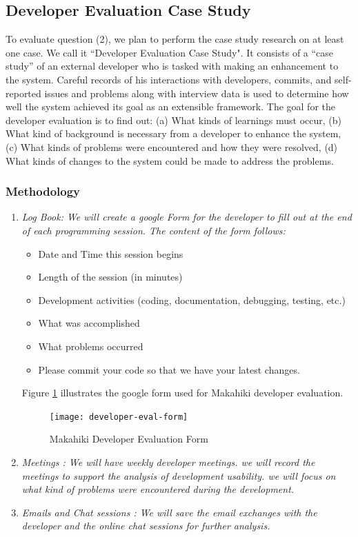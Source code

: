 \documentclass[11pt]{article}
\begin{document}
\subsection{Developer Evaluation Case Study}
To evaluate question (2), we plan to perform the case study research on at least one case. We call it ``Developer Evaluation Case Study". It consists of a ``case study'' of an external developer who is tasked with making an enhancement to the system.  Careful records of his interactions with developers, commits, and self-reported issues and problems along with interview data is used to determine how well the system achieved its goal as an extensible framework. The goal for the developer evaluation is to find out: (a) What kinds of learnings must occur, (b) What kind of background is necessary from a developer to enhance the system, (c) What kinds of problems were encountered and how they were resolved, (d) What kinds of changes to the system could be made to address the problems.

\subsubsection{Methodology}
\begin{enumerate}
\item \em Log Book\em: We will create a google Form for the developer to fill out at the end of each programming session. The content of the form follows:
 \begin{itemize} 
 \item Date and Time this session begins
 \item Length of the session (in minutes)
 \item Development activities (coding, documentation, debugging, testing, etc.)
 \item What was accomplished
 \item What problems occurred
 \item Please commit your code so that we have your latest changes.
 \end{itemize}

Figure \ref{fig:developer-eval-form} illustrates the google form used for Makahiki developer evaluation.

\begin{figure}[htbp] %
   \centering
   \texttt{[image: developer-eval-form]} 
   \caption{Makahiki Developer Evaluation Form}
   \label{fig:developer-eval-form}
\end{figure}
 
\item \em Meetings \em: We will have weekly developer meetings. we will record the meetings to support the analysis of development usability. we will focus on what kind of problems were encountered during the development.

\item \em Emails and Chat sessions \em: We will save the email exchanges with the developer and the online chat sessions for further analysis.

\end{enumerate}
\end{document}
